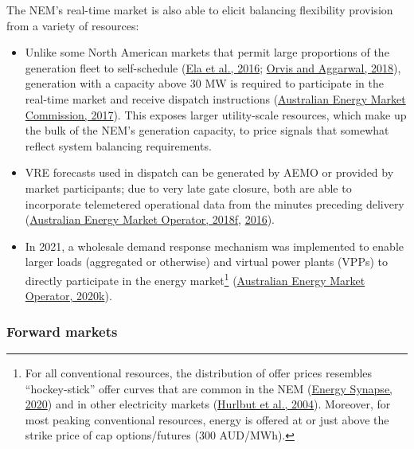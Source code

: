 \documentclass[12pt,a4paper,]{report}
\providecommand{\tightlist}{%
  \setlength{\itemsep}{0pt}\setlength{\parskip}{0pt}}
\begin{document}
The NEM's real-time market is also able to elicit balancing flexibility
provision from a variety of resources:

\begin{itemize}
\tightlist
\item
  Unlike some North American markets that permit large proportions of
  the generation fleet to self-schedule
  (\protect\hyperlink{ref-elaWholesaleElectricityMarket2016}{Ela et al.,
  2016};
  \protect\hyperlink{ref-orvisRefiningCompetitiveElectricity2018}{Orvis
  and Aggarwal, 2018}), generation with a capacity above 30 MW is
  required to participate in the real-time market and receive dispatch
  instructions
  (\protect\hyperlink{ref-australianenergymarketcommissionNonscheduledGenerationLoad2017}{Australian
  Energy Market Commission, 2017}). This exposes larger utility-scale
  resources, which make up the bulk of the NEM's generation capacity, to
  price signals that somewhat reflect system balancing requirements.
\item
  VRE forecasts used in dispatch can be generated by AEMO or provided by
  market participants; due to very late gate closure, both are able to
  incorporate telemetered operational data from the minutes preceding
  delivery
  (\protect\hyperlink{ref-australianenergymarketoperatorSemiScheduledGenerationDispatch2018}{Australian
  Energy Market Operator, 2018f},
  \protect\hyperlink{ref-australianenergymarketoperatorSchedulingErrorReport2016}{2016}).
\item
  In 2021, a wholesale demand response mechanism was implemented to
  enable larger loads (aggregated or otherwise) and virtual power plants
  (VPPs) to directly participate in the energy market\footnote{For all
    conventional resources, the distribution of offer prices resembles
    ``hockey-stick'' offer curves that are common in the NEM
    (\protect\hyperlink{ref-energysynapseDemandResponseNational2020}{Energy
    Synapse, 2020}) and in other electricity markets
    (\protect\hyperlink{ref-hurlbutProtectingMarketHockey2004}{Hurlbut
    et al., 2004}). Moreover, for most peaking conventional resources,
    energy is offered at or just above the strike price of cap
    options/futures (300 AUD/MWh).}
  (\protect\hyperlink{ref-australianenergymarketoperatorWholesaleDemandReponse2020}{Australian
  Energy Market Operator, 2020k}).
\end{itemize}

\hypertarget{forward-markets}{%
\subsubsection{Forward markets}\label{forward-markets}}
\end{document}
